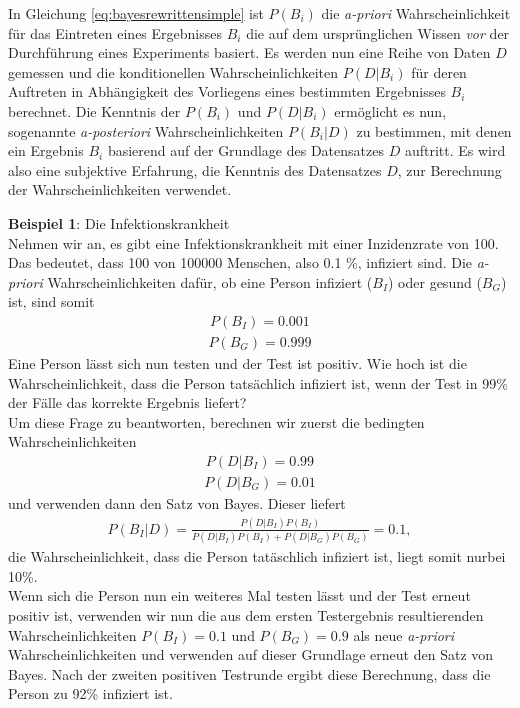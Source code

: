 In Gleichung \ref{eq:bayesrewrittensimple} ist $P(B_i)$ die \textit{a-priori} Wahrscheinlichkeit für das Eintreten eines Ergebnisses $B_i$ die auf dem ursprünglichen Wissen \textit{vor} der Durchführung eines Experiments basiert. Es werden nun eine Reihe von Daten $D$ gemessen und die konditionellen Wahrscheinlichkeiten $ P(D|B_i)$ für deren Auftreten in Abhängigkeit des Vorliegens eines bestimmten Ergebnisses $B_i$ berechnet. Die Kenntnis der $P(B_i)$ und $ P(D|B_i)$ ermöglicht es nun, sogenannte \textit{a-posteriori} Wahrscheinlichkeiten $ P(B_i|D)$ zu bestimmen, mit denen ein Ergebnis $B_i$ basierend auf der Grundlage des Datensatzes $D$ auftritt. Es wird also eine subjektive Erfahrung, die Kenntnis des Datensatzes $D$, zur Berechnung der Wahrscheinlichkeiten verwendet.


\begin{center}
\begin{tcolorbox}[enhanced,width=6in,drop fuzzy shadow southwest,
colframe=blue!50!black,colback=blue!01]
\textbf{Beispiel 1}: Die Infektionskrankheit \\
 Nehmen wir an, es gibt eine Infektionskrankheit mit einer Inzidenzrate von 100. Das bedeutet, dass 100 von 100000 Menschen, also 0.1 \%, infiziert sind.  Die \textit{a-priori} Wahrscheinlichkeiten dafür, ob eine Person infiziert ($B_I$) oder gesund ($B_G$) ist, sind somit
 \begin{align}
 P(B_I) = 0.001 \label{eq:proability-example}
 \end{align}
  \begin{align}
 P(B_G) = 0.999 \label{eq:proability-example2}
 \end{align}
 Eine Person lässt sich nun testen und der Test ist positiv. Wie hoch ist die Wahrscheinlichkeit, dass die Person tatsächlich infiziert ist, wenn der Test in 99\% der Fälle das korrekte Ergebnis liefert?  \\

 Um diese Frage zu beantworten, berechnen wir zuerst die bedingten Wahrscheinlichkeiten
 \begin{align}
P(D|B_I) = 0.99
 \end{align}
  \begin{align}
P(D|B_G) = 0.01
 \end{align}
und verwenden dann den Satz von Bayes. Dieser liefert
\begin{align}
P(B_I|D) = \frac{P(D|B_I)P(B_I)}{P(D|B_I)P(B_I) + P(D|B_G)P(B_G)} = 0.1,
\end{align}
die Wahrscheinlichkeit, dass die Person tatäschlich infiziert ist, liegt somit \glqq nur\grqq  bei 10\%. \\

Wenn sich die Person nun ein weiteres Mal testen lässt und der Test erneut positiv ist, verwenden wir nun die aus dem ersten Testergebnis resultierenden Wahrscheinlichkeiten $P(B_I) = 0.1$ und $P(B_G) = 0.9$ als neue \textit{a-priori} Wahrscheinlichkeiten und verwenden auf dieser Grundlage erneut den Satz von Bayes. Nach der zweiten positiven Testrunde ergibt diese Berechnung, dass die Person zu 92\% infiziert ist. 
\end{tcolorbox}
\end{center}


